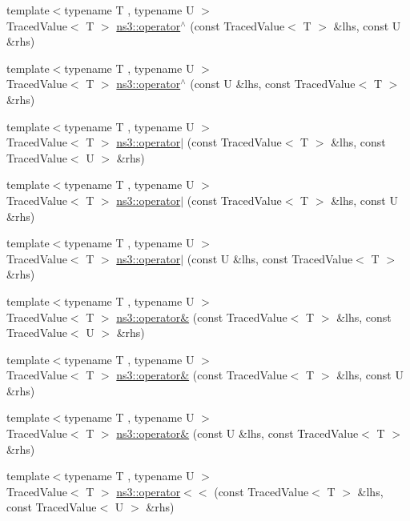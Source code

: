 \begin{DoxyCompactItemize}
\item 
{\footnotesize template$<$typename T , typename U $>$ }\\Traced\+Value$<$ T $>$ \hyperlink{group__tracing_ga6a9898acf7351314be73d7a9ccf6c150}{ns3\+::operator$^\wedge$} (const Traced\+Value$<$ T $>$ \&lhs, const U \&rhs)
\item 
{\footnotesize template$<$typename T , typename U $>$ }\\Traced\+Value$<$ T $>$ \hyperlink{group__tracing_ga74ae4ddefb52a4ad3d30e9fc6dd17970}{ns3\+::operator$^\wedge$} (const U \&lhs, const Traced\+Value$<$ T $>$ \&rhs)
\item 
{\footnotesize template$<$typename T , typename U $>$ }\\Traced\+Value$<$ T $>$ \hyperlink{group__tracing_gaddfa7ce147f93ae8281ed0579bd2dfca}{ns3\+::operator$\vert$} (const Traced\+Value$<$ T $>$ \&lhs, const Traced\+Value$<$ U $>$ \&rhs)
\item 
{\footnotesize template$<$typename T , typename U $>$ }\\Traced\+Value$<$ T $>$ \hyperlink{group__tracing_gafc8255bda985965e99f43ee32bc0bf9f}{ns3\+::operator$\vert$} (const Traced\+Value$<$ T $>$ \&lhs, const U \&rhs)
\item 
{\footnotesize template$<$typename T , typename U $>$ }\\Traced\+Value$<$ T $>$ \hyperlink{group__tracing_ga11f07bd979f678245e72777432628220}{ns3\+::operator$\vert$} (const U \&lhs, const Traced\+Value$<$ T $>$ \&rhs)
\item 
{\footnotesize template$<$typename T , typename U $>$ }\\Traced\+Value$<$ T $>$ \hyperlink{group__tracing_ga4185eb99c134307ac49a1b3722de3389}{ns3\+::operator\&} (const Traced\+Value$<$ T $>$ \&lhs, const Traced\+Value$<$ U $>$ \&rhs)
\item 
{\footnotesize template$<$typename T , typename U $>$ }\\Traced\+Value$<$ T $>$ \hyperlink{group__tracing_ga55cd69c0b0d59a879b0a255b821a66f6}{ns3\+::operator\&} (const Traced\+Value$<$ T $>$ \&lhs, const U \&rhs)
\item 
{\footnotesize template$<$typename T , typename U $>$ }\\Traced\+Value$<$ T $>$ \hyperlink{group__tracing_ga11dc54b38fdc344402bda1a396f3ddcc}{ns3\+::operator\&} (const U \&lhs, const Traced\+Value$<$ T $>$ \&rhs)
\item 
{\footnotesize template$<$typename T , typename U $>$ }\\Traced\+Value$<$ T $>$ \hyperlink{group__tracing_ga2ecec8584d08f46cb3a7a08e67803e31}{ns3\+::operator$<$$<$} (const Traced\+Value$<$ T $>$ \&lhs, const Traced\+Value$<$ U $>$ \&rhs)

\end{DoxyCompactItemize}
